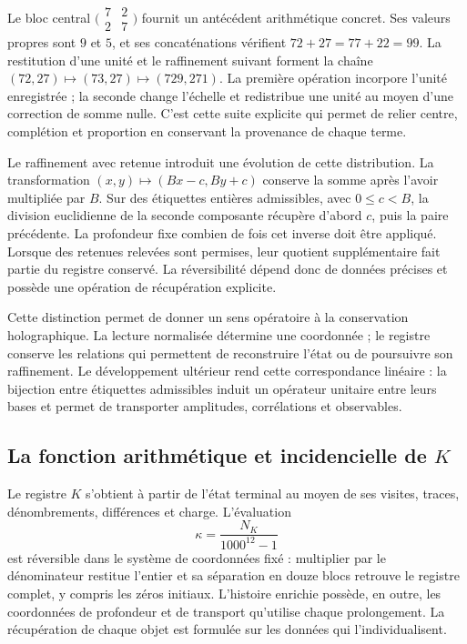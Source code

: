 Le bloc central \(\bigl(\begin{smallmatrix}7&2\\2&7\end{smallmatrix}\bigr)\) fournit un antécédent arithmétique concret. Ses valeurs propres sont \(9\) et \(5\), et ses concaténations vérifient \(72+27=77+22=99\). La restitution d’une unité et le raffinement suivant forment la chaîne \((72,27)\mapsto(73,27)\mapsto(729,271)\). La première opération incorpore l’unité enregistrée ; la seconde change l’échelle et redistribue une unité au moyen d’une correction de somme nulle. C’est cette suite explicite qui permet de relier centre, complétion et proportion en conservant la provenance de chaque terme.

Le raffinement avec retenue introduit une évolution de cette distribution. La transformation \((x,y)\mapsto(Bx-c,By+c)\) conserve la somme après l'avoir multipliée par \(B\). Sur des étiquettes entières admissibles, avec \(0\leq c<B\), la division euclidienne de la seconde composante récupère d'abord \(c\), puis la paire précédente. La profondeur fixe combien de fois cet inverse doit être appliqué. Lorsque des retenues relevées sont permises, leur quotient supplémentaire fait partie du registre conservé. La réversibilité dépend donc de données précises et possède une opération de récupération explicite.

Cette distinction permet de donner un sens opératoire à la conservation holographique. La lecture normalisée détermine une coordonnée ; le registre conserve les relations qui permettent de reconstruire l’état ou de poursuivre son raffinement. Le développement ultérieur rend cette correspondance linéaire : la bijection entre étiquettes admissibles induit un opérateur unitaire entre leurs bases et permet de transporter amplitudes, corrélations et observables.


\subsection*{La fonction arithmétique et incidencielle de \(K\)}
Le registre \(K\) s’obtient à partir de l’état terminal au moyen de ses visites, traces, dénombrements, différences et charge. L’évaluation
\[
\kappa=\frac{N_K}{1000^{12}-1}
\]
est réversible dans le système de coordonnées fixé : multiplier par le dénominateur restitue l’entier et sa séparation en douze blocs retrouve le registre complet, y compris les zéros initiaux. L’histoire enrichie possède, en outre, les coordonnées de profondeur et de transport qu’utilise chaque prolongement. La récupération de chaque objet est formulée sur les données qui l’individualisent.

